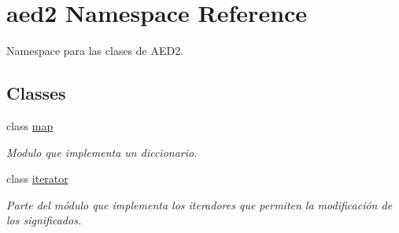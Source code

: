 \hypertarget{namespaceaed2}{\section{aed2 \-Namespace \-Reference}
\label{namespaceaed2}
}


\-Namespace para las clases de \-A\-E\-D2.  


\subsection*{\-Classes}
\begin{DoxyCompactItemize}
\item 
class \hyperlink{classaed2_1_1map}{map}
\begin{DoxyCompactList}\small\item\em \-Modulo que implementa un diccionario. \end{DoxyCompactList}\item 
class \hyperlink{classaed2_1_1iterator}{iterator}
\begin{DoxyCompactList}\small\item\em \-Parte del módulo que implementa los iteradores que permiten la modificación de los significados. \end{DoxyCompactList}\end{DoxyCompactItemize}
